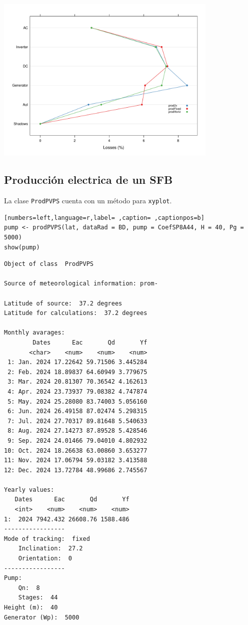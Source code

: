 \begin{center}
\includegraphics[width=0.8\textwidth]{figuras/codigo-prodgcpv3.pdf}
\end{center}

\subsection{Producción electrica de un SFB}
\label{sec:orgbe1694d}
La clase \texttt{ProdPVPS} cuenta con un método para \texttt{xyplot}.
\begin{lstlisting}[numbers=left,language=r,label= ,caption= ,captionpos=b]
pump <- prodPVPS(lat, dataRad = BD, pump = CoefSP8A44, H = 40, Pg = 5000)
show(pump)
\end{lstlisting}

\begin{verbatim}
Object of class  ProdPVPS 

Source of meteorological information: prom- 

Latitude of source:  37.2 degrees
Latitude for calculations:  37.2 degrees

Monthly avarages:
        Dates      Eac       Qd       Yf
       <char>    <num>    <num>    <num>
 1: Jan. 2024 17.22642 59.71506 3.445284
 2: Feb. 2024 18.89837 64.60949 3.779675
 3: Mar. 2024 20.81307 70.36542 4.162613
 4: Apr. 2024 23.73937 79.08382 4.747874
 5: May. 2024 25.28080 83.74003 5.056160
 6: Jun. 2024 26.49158 87.02474 5.298315
 7: Jul. 2024 27.70317 89.81648 5.540633
 8: Aug. 2024 27.14273 87.89528 5.428546
 9: Sep. 2024 24.01466 79.04010 4.802932
10: Oct. 2024 18.26638 63.00860 3.653277
11: Nov. 2024 17.06794 59.03182 3.413588
12: Dec. 2024 13.72784 48.99686 2.745567

Yearly values:
   Dates      Eac       Qd       Yf
   <int>    <num>    <num>    <num>
1:  2024 7942.432 26608.76 1588.486
-----------------
Mode of tracking:  fixed 
    Inclination:  27.2 
    Orientation:  0 
-----------------
Pump:
    Qn:  8 
    Stages:  44 
Height (m):  40 
Generator (Wp):  5000
\end{verbatim}

